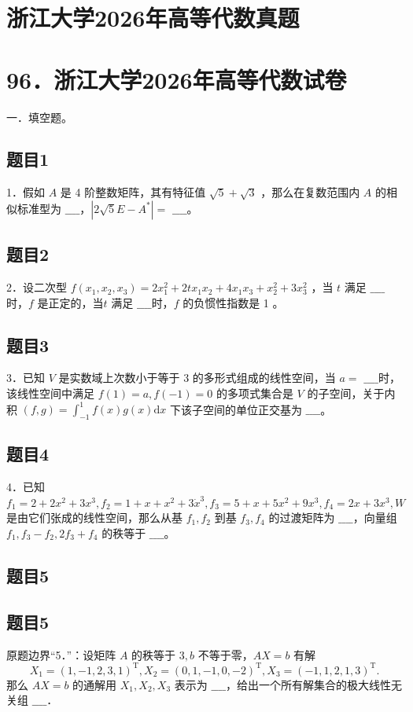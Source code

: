 \documentclass{article}
\begin{document}
\section*{浙江大学2026年高等代数真题}
\section*{96．浙江大学2026年高等代数试卷}
一．填空题。\\

\subsection{题目1}
1．假如 \(A\) 是 4 阶整数矩阵，其有特征值 \(\sqrt{5}+\sqrt{3}\) ，那么在复数范围内 \(A\) 的相似标准型为 \(\_\_\_\_\)，\(\left|2 \sqrt{5} E-A^{*}\right|=\) \(\_\_\_\_\)。

\subsection{题目2}
2．设二次型 \(f\left(x_{1}, x_{2}, x_{3}\right)=2 x_{1}^{2}+2 t x_{1} x_{2}+4 x_{1} x_{3}+x_{2}^{2}+3 x_{3}^{2}\) ，当 \(t\) 满足 \(\_\_\_\_\)时，\(f\) 是正定的，当\(t\) 满足 \(\_\_\_\_\)时，\(f\) 的负惯性指数是 1 。

\subsection{题目3}
3．已知 \(V\) 是实数域上次数小于等于 3 的多形式组成的线性空间，当 \(a=\) \(\_\_\_\_\)时，该线性空间中满足 \(f(1)=a, f(-1)=0\) 的多项式集合是 \(V\) 的子空间，关于内积 \((f, g)=\int_{-1}^{1} f(x) g(x) \mathrm{d} x\) 下该子空间的单位正交基为 \(\_\_\_\_\)。

\subsection{题目4}
4．已知 \(f_{1}=2+2 x^{2}+3 x^{3}, f_{2}=1+x+x^{2}+3 \dot{x}^{3}, f_{3}=5+x+5 x^{2}+9 x^{3}, f_{4}=2 x+3 x^{3}, W\) 是由它们张成的线性空间，那么从基 \(f_{1}, f_{2}\) 到基 \(f_{3}, f_{4}\) 的过渡矩阵为 \(\_\_\_\_\)，向量组 \(f_{1}, f_{3}-f_{2}, 2 f_{3}+f_{4}\) 的秩等于 \(\_\_\_\_\)。

\begin{itemize}

\subsection{题目5}
\end{itemize}

\subsection{题目5}
原题边界“5．”：设矩阵 \(A\) 的秩等于 \(3, b\) 不等于零，\(A X=b\) 有解
\[
X_{1}=(1,-1,2,3,1)^{\mathrm{T}}, X_{2}=(0,1,-1,0,-2)^{\mathrm{T}}, X_{3}=(-1,1,2,1,3)^{\mathrm{T}} .
\]
那么 \(A X=b\) 的通解用 \(X_{1}, X_{2}, X_{3}\) 表示为 \(\_\_\_\_\)，给出一个所有解集合的极大线性无关组 \(\_\_\_\_\)．
\end{document}
